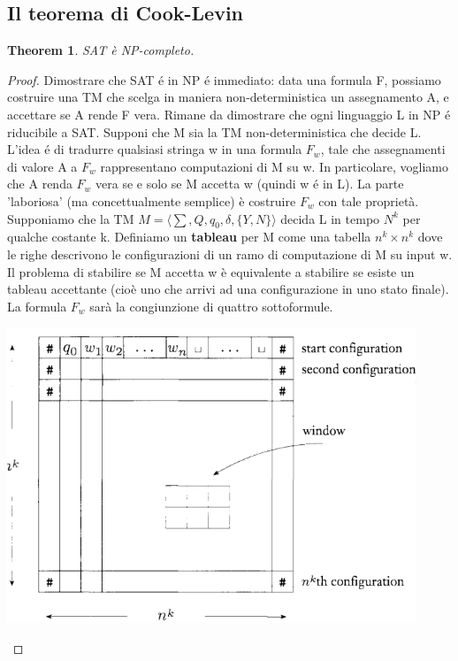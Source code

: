 \documentclass[a4paper, 12pt]{article}
\newtheorem{theorem}{Theorem}[section]
\begin{document}
\subsection{Il teorema di Cook-Levin}
\begin{theorem}
\label{th:cooklevin}
SAT \`e NP-completo.
\end{theorem}
\begin{proof}
Dimostrare che SAT é in NP é immediato: data una formula F, possiamo costruire una TM che scelga in maniera non-deterministica un assegnamento A, e accettare se A rende F vera.
Rimane da dimostrare che ogni linguaggio L in NP é riducibile a SAT.
Supponi che M sia la TM non-deterministica che decide L. L’idea é di tradurre qualsiasi stringa w in una formula $F_w$, tale che assegnamenti di valore A a $F_w$ rappresentano computazioni di M su w. In particolare, vogliamo che A renda $F_w$ vera se e solo se M accetta w (quindi w é in L). La parte 'laboriosa' (ma concettualmente semplice) \`e costruire $F_w$ con tale propriet\`a.
Supponiamo che la TM $M=\langle \sum, Q, q_0, \delta, \{Y,N\}\rangle$ decida L in tempo $N^{k}$ per qualche costante k. Definiamo un \textbf{tableau} per M come una tabella $n^{k} \times n^{k}$ dove le righe descrivono le configurazioni di un ramo di computazione di M su input w. Il problema di stabilire se M accetta w \`e equivalente a stabilire se esiste un tableau accettante (cio\`e uno che arrivi ad una configurazione in uno stato finale).
La formula $F_w$ sar\`a la congiunzione di quattro sottoformule.
\begin{center}
\includegraphics[scale=0.5]{tableau.png}
\end{center}


\end{proof}
\end{document}

